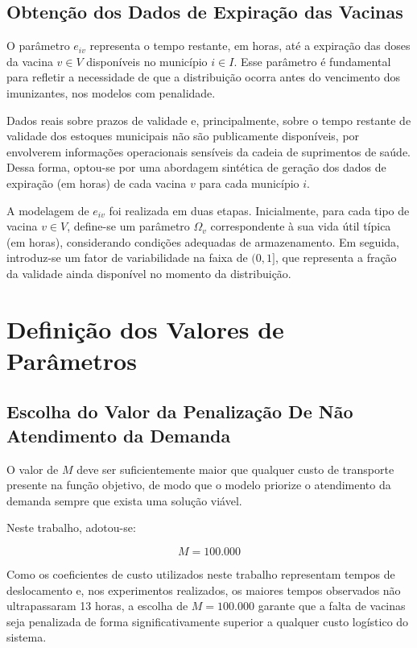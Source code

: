 \subsection{Obtenção dos Dados de Expiração das Vacinas}

O parâmetro $e_{iv}$ representa o tempo restante, em horas, até a expiração das doses da vacina $v \in V$ disponíveis no município $i \in I$. Esse parâmetro é fundamental para refletir a necessidade de que a distribuição ocorra antes do vencimento dos imunizantes, nos modelos com penalidade.

Dados reais sobre prazos de validade e, principalmente, sobre o tempo restante de validade dos estoques municipais não são publicamente disponíveis, por envolverem informações operacionais sensíveis da cadeia de suprimentos de saúde. Dessa forma, optou-se por uma abordagem sintética de geração dos dados de expiração (em horas) de cada vacina $v$ para cada município $i$.

A modelagem de $e_{iv}$ foi realizada em duas etapas. Inicialmente, para cada tipo de vacina $v \in V$, define-se um parâmetro $\Omega_v$ correspondente à sua vida útil típica (em horas), considerando condições adequadas de armazenamento. Em seguida, introduz-se um fator de variabilidade na faixa de $(0,1]$, que representa a fração da validade ainda disponível no momento da distribuição.


\section{Definição dos Valores de Parâmetros}

\subsection{Escolha do Valor da Penalização De Não Atendimento da Demanda}

O valor de $M$ deve ser suficientemente maior que qualquer custo de transporte presente na função objetivo, de modo que o modelo priorize o atendimento da demanda sempre que exista uma solução viável.

Neste trabalho, adotou-se:

\[
M = 100.000
\]

Como os coeficientes de custo utilizados neste trabalho representam tempos de deslocamento e, nos experimentos realizados, os maiores tempos observados não ultrapassaram 13 horas, a escolha de $M = 100.000$ garante que a falta de vacinas seja penalizada de forma significativamente superior a qualquer custo logístico do sistema.

